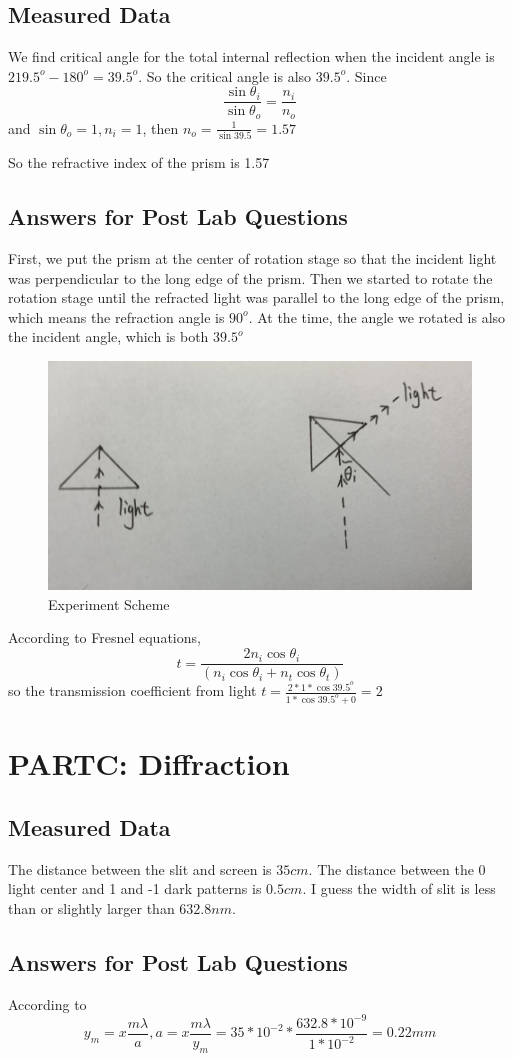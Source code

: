 \documentclass[12pt]{article}
\begin{document}
\subsection{Measured Data}
We find critical angle for the total internal reflection when the incident angle is $219.5^o-180^o=39.5^o$. So the critical angle is also $39.5^o$. Since $$\frac{\sin\theta_i}{\sin\theta_o}=\frac{n_i}{n_o}$$ and $\sin\theta_o=1,n_i=1$, then
$n_o=\frac{1}{\sin39.5}=1.57$
\par So the refractive index of the prism is 1.57
\subsection{Answers for Post Lab Questions}
First, we put the prism at the center of rotation stage so that the incident light was perpendicular to the long edge of the prism. Then we started to rotate the rotation stage until the refracted light was parallel to the long edge of the prism, which means the refraction angle is $90^o$. At the time, the angle we rotated is also the incident angle, which is both $39.5^o$
\begin{figure}[H]
\centering
\includegraphics[scale=0.5]{P2.jpg}
\caption{Experiment Scheme}
\end{figure}
\par According to Fresnel equations, $$t=\frac{2n_i\cos\theta_i}{(n_i\cos\theta_i+n_t\cos\theta_t)}$$
so the transmission coefficient from light $t=\frac{2*1*\cos39.5^o}{1*\cos39.5^o+0}=2$
\section{PARTC: Diffraction}
\subsection{Measured Data}
The distance between the slit and screen is $35cm$. The distance between the 0 light center and 1 and -1 dark patterns is $0.5cm$. I guess the width of slit is less than or slightly larger than $632.8nm$. 
\subsection{Answers for Post Lab Questions}
According to $$y_m=x\frac{m\lambda}{a},a=x\frac{m\lambda}{y_m}=35*10^{-2}*\frac{632.8*10^{-9}}{1*10^{-2}}=0.22mm$$
\end{document}
